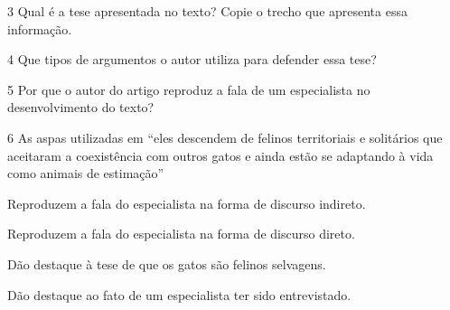 \num{3} Qual é a tese apresentada no texto? Copie o trecho que apresenta
essa informação.


\num{4} Que tipos de argumentos o autor utiliza para defender essa tese?


\num{5} Por que o autor do artigo reproduz a fala de um especialista no
desenvolvimento do texto?


\num{6} As aspas utilizadas em ``eles descendem de felinos territoriais
e solitários que aceitaram a coexistência com outros gatos e ainda estão
se adaptando à vida como animais de estimação''

\begin{escolha}
\item Reproduzem a fala do especialista na forma de discurso indireto. 
\item Reproduzem a fala do especialista na forma de discurso direto.
\item Dão destaque à tese de que os gatos são felinos selvagens.
\item Dão destaque ao fato de um especialista ter sido entrevistado.
\end{escolha}


